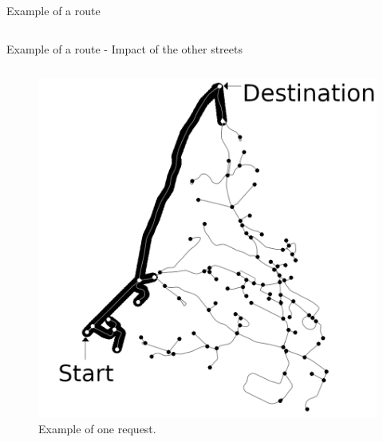 \documentclass[Ligatures=TeX,table,svgnames,usetotalslideindicator,compress,10pt,aspectratio=169]{beamer}
\begin{document}
\begin{frame}{Example of a route}
\begin{columns}
\begin{column}{0.5\textwidth}
\end{column}

\end{columns}
\end{frame}



\begin{frame}{Example of a route - Impact of the other streets} 
\begin{columns}        
   
\begin{column}{0.5\textwidth}
\begin{figure}[!h]
        \centering
        \includegraphics[width=\textwidth]{images/path_3.png}
        \caption{Example of one request.}
      \end{figure}


\end{column}
\end{columns}
\end{frame}
\end{document}
